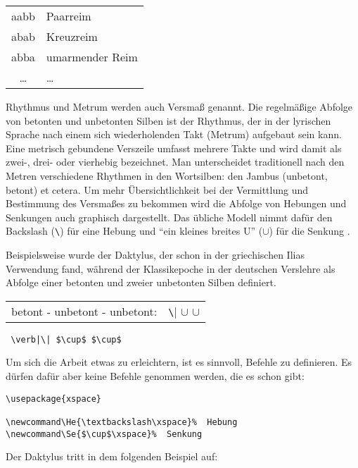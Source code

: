 \begin{tabular}{cl}
aabb & Paarreim \\
abab & Kreuzreim \\
abba & umarmender Reim \\
\ldots & \ldots \\
\end{tabular}

Rhythmus und Metrum werden auch Versmaß genannt. Die regelmäßige Abfolge von betonten
und unbetonten Silben ist der Rhythmus, der in der lyrischen Sprache nach einem sich 
wiederholenden Takt (Metrum) aufgebaut sein kann. Eine metrisch gebundene Verszeile 
umfasst mehrere Takte und wird damit als zwei-, drei- oder vierhebig bezeichnet. Man
unterscheidet traditionell nach den Metren verschiedene Rhythmen in den Wortsilben:
den Jambus (unbetont, betont) et cetera. Um mehr Übersichtlichkeit bei der Vermittlung und
Bestimmung des Versmaßes zu bekommen wird die Abfolge von Hebungen und Senkungen auch
graphisch dargestellt. Das übliche Modell nimmt dafür den Backslash (\verb|\|) für eine 
Hebung und "`ein kleines breites U"' ($\cup$) für die Senkung \cite[S.\,17]{Neuhaus}.

Beispielsweise wurde der Daktylus, der schon in der griechischen Ilias Verwendung fand,
während der Klassikepoche in der deutschen Verslehre als Abfolge einer 
betonten und zweier unbetonten Silben definiert.

\begin{tabular}{ll}
betont - unbetont - unbetont: &  \verb|\| $\cup$ $\cup$ \\
\end{tabular}

\begin{lstlisting}
 \verb|\| $\cup$ $\cup$ 
\end{lstlisting}

Um sich die Arbeit etwas zu erleichtern, ist es sinnvoll, Befehle zu definieren.
Es dürfen dafür aber keine Befehle genommen werden, die es schon gibt:
\begin{lstlisting}
\usepackage{xspace}

\newcommand\He{\textbackslash\xspace}%  Hebung
\newcommand\Se{$\cup$\xspace}%  Senkung 
\end{lstlisting}

Der Daktylus tritt in dem folgenden Beispiel auf:

